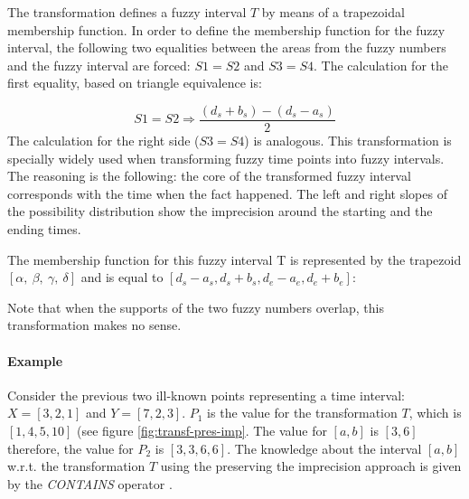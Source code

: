 \documentclass[twoside,twocolumn,a4paper]{article}
\begin{document}
The transformation defines a fuzzy interval $T$ by means of a trapezoidal membership function. In order to define the membership function for the fuzzy interval, the following two equalities between the areas from the fuzzy numbers and the fuzzy interval are forced: $S1=S2$ and $S3=S4$. The calculation for the first equality, based on triangle equivalence is:

\begin{equation}
\label{eq:preserving-imprecision}
S1=S2 \Rightarrow \frac{\left(d_s+b_s\right)-\left(d_s-a_s\right)}{2}
\end{equation}        			
The calculation for the right side ($S3=S4$) is analogous.
This transformation is specially widely used when transforming fuzzy time points into fuzzy intervals. The reasoning is the following: the core of the transformed fuzzy interval corresponds with the time when the fact happened. The left and right slopes of the possibility distribution show the imprecision around the starting and the ending times. 

The membership function for this fuzzy interval T is represented by the trapezoid $\left[\alpha,\ \beta,\ \gamma,\ \delta\right]$ and is equal to $\left[ d_s - a_s, d_s + b_s,d_e - a_e,d_e + b_e\right]$:


Note that when the supports of the two fuzzy numbers overlap, this transformation makes no sense.


\paragraph{Example}
Consider the previous two ill-known points representing a time interval:  $X = \left[3, 2, 1\right]$ and $Y = \left[7, 2, 3 \right]$.
$P_1$ is the value for the transformation $T$, which is $\left[1,4,5,10 \right]$ (see figure \ref{fig:transf-pres-imp}. 
The value for $\left[a, b \right]$ is $\left[3,6 \right]$ therefore, the value for $P_2$ is $\left[3,3,6,6 \right]$. 
The knowledge about the interval $\left[a, b \right]$ w.r.t. the transformation $T$ using the preserving the imprecision approach is given by the \emph{CONTAINS} operator \cite{Garrido2009}.
\end{document}
